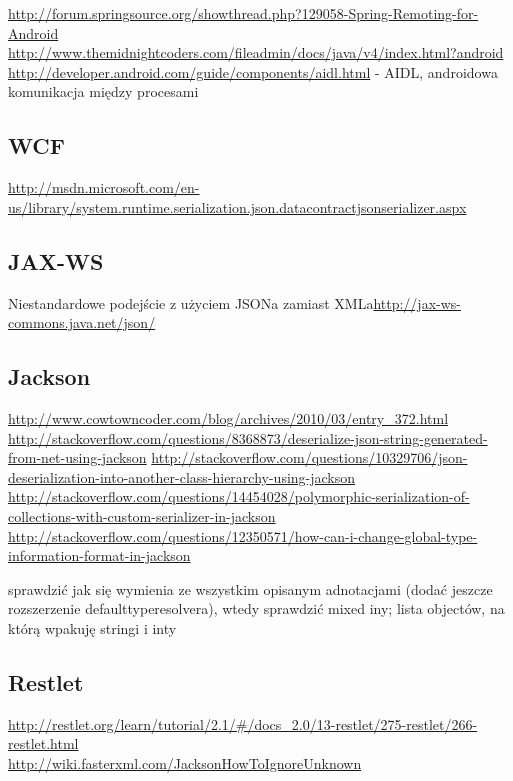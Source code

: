 \url{http://forum.springsource.org/showthread.php?129058-Spring-Remoting-for-Android}\\
\url{http://www.themidnightcoders.com/fileadmin/docs/java/v4/index.html?android}\\
\url{http://developer.android.com/guide/components/aidl.html} - AIDL, androidowa komunikacja między procesami\\


\subsection{WCF}
\url{http://msdn.microsoft.com/en-us/library/system.runtime.serialization.json.datacontractjsonserializer.aspx}\\

\subsection{JAX-WS}
Niestandardowe podejście z użyciem JSONa zamiast XMLa\url{http://jax-ws-commons.java.net/json/}\\

\subsection{Jackson}
\url{http://www.cowtowncoder.com/blog/archives/2010/03/entry_372.html}\\
\url{http://stackoverflow.com/questions/8368873/deserialize-json-string-generated-from-net-using-jackson}
\url{http://stackoverflow.com/questions/10329706/json-deserialization-into-another-class-hierarchy-using-jackson}
\url{http://stackoverflow.com/questions/14454028/polymorphic-serialization-of-collections-with-custom-serializer-in-jackson}
\url{http://stackoverflow.com/questions/12350571/how-can-i-change-global-type-information-format-in-jackson}

sprawdzić jak się wymienia ze wszystkim opisanym adnotacjami (dodać jeszcze rozszerzenie defaulttyperesolvera), wtedy sprawdzić mixed iny; lista objectów, na którą wpakuję stringi i inty

\subsection{Restlet}
\url{http://restlet.org/learn/tutorial/2.1/#/docs_2.0/13-restlet/275-restlet/266-restlet.html}\\
\url{http://wiki.fasterxml.com/JacksonHowToIgnoreUnknown}\\

